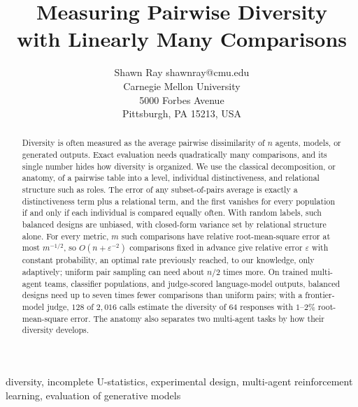 \documentclass[twoside,11pt]{article}
\begin{document}
\title{Measuring Pairwise Diversity\\ with Linearly Many Comparisons}

\author{\name Shawn Ray \email shawnray@cmu.edu \\
       \addr Carnegie Mellon University\\
       5000 Forbes Avenue\\
       Pittsburgh, PA 15213, USA}

\editor{}

\maketitle

\begin{abstract}%
Diversity is often measured as the average pairwise dissimilarity of $n$
agents, models, or generated outputs. Exact evaluation needs quadratically
many comparisons, and its single number hides how diversity is
organized. We use the classical decomposition, or anatomy, of
a pairwise table into a level, individual distinctiveness, and relational
structure such as roles. The error of any subset-of-pairs average is
exactly a distinctiveness term plus a relational term, and the first
vanishes for every population if and only if each individual is compared
equally often. With random labels, such balanced designs are unbiased, with
closed-form variance set by relational structure alone. For every metric,
$m$ such comparisons have relative root-mean-square error at most
$m^{-1/2}$, so ${O(n+\varepsilon^{-2})}$ comparisons fixed in advance give
relative error $\varepsilon$ with constant probability, an optimal rate
previously reached, to our knowledge, only adaptively; uniform pair sampling
can need about $n/2$ times more. On trained multi-agent teams, classifier
populations, and judge-scored language-model outputs, balanced designs need
up to seven times fewer comparisons than uniform pairs; with a
frontier-model judge, $128$ of $2{,}016$ calls estimate the diversity of
$64$ responses with $1$--$2\%$ root-mean-square error. The anatomy also
separates two multi-agent tasks by how their diversity develops.
\end{abstract}

\begin{keywords}
  diversity, incomplete U-statistics, experimental design,
  multi-agent reinforcement learning, evaluation of generative models
\end{keywords}

\end{document}
